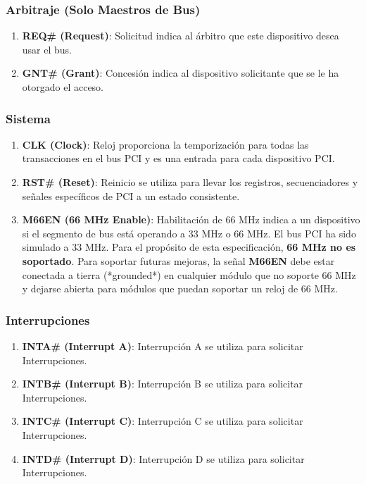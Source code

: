 \documentclass[12pt]{article}
\begin{document}
	\subsubsection*{Arbitraje (Solo Maestros de Bus)}
	\begin{enumerate}
		\item \textbf{REQ\# (Request)}: Solicitud indica al árbitro que este dispositivo desea usar el bus.
		
		\item \textbf{GNT\# (Grant)}: Concesión indica al dispositivo solicitante que se le ha otorgado el acceso.
	\end{enumerate}
	
	\subsubsection*{Sistema}
	\begin{enumerate}
		\item \textbf{CLK (Clock)}: Reloj proporciona la temporización para todas las transacciones en el bus PCI y es una entrada para cada dispositivo PCI.
		
		\item \textbf{RST\# (Reset)}: Reinicio se utiliza para llevar los registros, secuenciadores y señales específicos de PCI a un estado consistente.
		
		\item \textbf{M66EN (66 MHz Enable)}: Habilitación de 66 MHz indica a un dispositivo si el segmento de bus está operando a 33 MHz o 66 MHz. El bus PCI ha sido simulado a 33 MHz. Para el propósito de esta especificación, \textbf{66 MHz no es soportado}. Para soportar futuras mejoras, la señal \textbf{M66EN} debe estar conectada a tierra (*grounded*) en cualquier módulo que no soporte 66 MHz y dejarse abierta para módulos que puedan soportar un reloj de 66 MHz.
	\end{enumerate}
	
	\subsubsection*{Interrupciones}
	\begin{enumerate}
		\item \textbf{INTA\# (Interrupt A)}: Interrupción A se utiliza para solicitar Interrupciones.
		
		\item \textbf{INTB\# (Interrupt B)}: Interrupción B se utiliza para solicitar Interrupciones.
		
		\item \textbf{INTC\# (Interrupt C)}: Interrupción C se utiliza para solicitar Interrupciones.
		
		\item \textbf{INTD\# (Interrupt D)}: Interrupción D se utiliza para solicitar Interrupciones.
	\end{enumerate}
	
\end{document}
